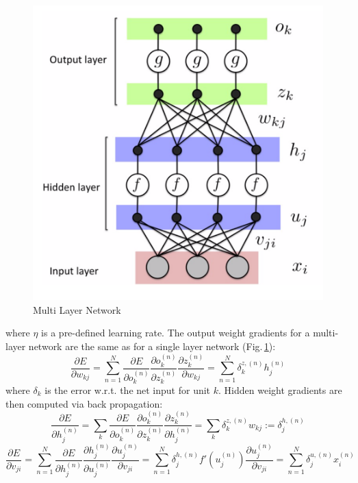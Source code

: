 \begin{figure}[h]
	\centering
	\includegraphics[scale=0.5]{Figs/multilayerbackprop.png}
    \caption{Multi Layer Network}
    \label{multi}
\end{figure}

where $\eta$ is a pre-defined learning rate. The output weight gradients for a multi-layer network are the same as for a single layer network (Fig.\,\ref{multi}):
$$\frac{\partial E}{\partial w_{kj}} =  \sum_{n=1}^N \frac{\partial E}{\partial o_{k}^{(n)}}\frac{\partial o_{k}^{(n)}}{\partial z_{k}^{(n)}} \frac{\partial z_{k}^{(n)}}{\partial w_{kj}} = \sum_{n=1}^N \delta_k^{z,(n)} h_j^{(n)}$$
where $\delta_k$ is the error w.r.t. the net input for unit $k$. Hidden weight gradients are then computed via back propagation:
$$\frac{\partial E}{\partial h_{j}^{(n)}} =  \sum_{k} \frac{\partial E}{\partial o_{k}^{(n)}}\frac{\partial o_{k}^{(n)}}{\partial z_{k}^{(n)}} \frac{\partial z_{k}^{(n)}}{\partial h_{j}^{(n)}} = \sum_{k} \delta_k^{z,(n)} w_{kj} := \delta_j^{h,(n)}$$
$$ \frac{\partial E}{\partial v_{ji}} 
= \sum_{n=1}^N \frac{\partial E}{\partial h_{j}^{(n)}}\frac{\partial h_{j}^{(n)}}{\partial u_{j}^{(n)}} \frac{\partial u_j^{(n)}}{\partial v_{ji}}
= \sum_{n=1}^N \delta_j^{h,(n)} f'(u_j^{(n)})\frac{\partial u_j^{(n)}}{\partial v_{ji}} 
= \sum_{n=1}^N \delta_j^{u,(n)} x_i^{(n)} $$

